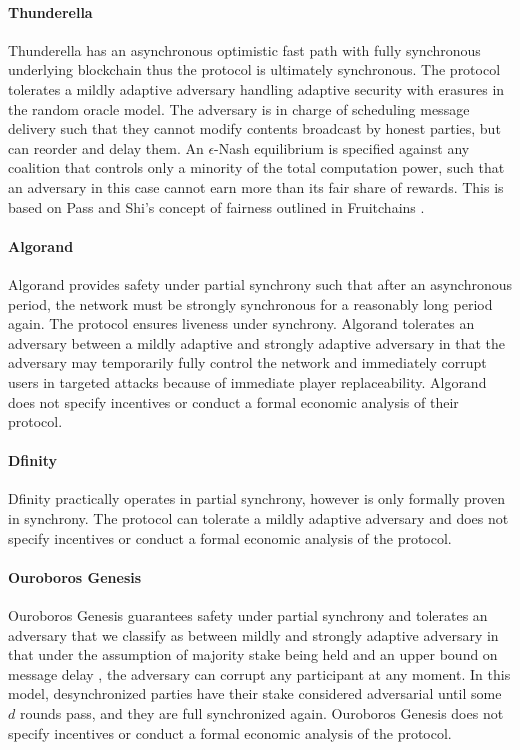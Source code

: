 \documentclass[10pt,journal,compsoc]{IEEEtran}
\newcommand\note[1]{\todo[inline]{\textbf{TODO:} #1}}
\begin{document}
\paragraph{Thunderella} Thunderella has an asynchronous optimistic fast path with fully synchronous underlying blockchain thus the protocol is ultimately synchronous. The protocol tolerates a mildly adaptive adversary handling adaptive security with erasures in the random oracle model. The adversary is in charge of scheduling message delivery such that they cannot modify contents broadcast by honest parties, but can reorder and delay them. An $\epsilon$-Nash equilibrium is specified against any coalition that controls only a minority of the total computation power, such that an adversary in this case cannot earn more than its fair share of rewards. This is based on Pass and Shi's concept of fairness outlined in Fruitchains \cite{fruitchains}.
\paragraph{Algorand} Algorand provides safety under partial synchrony such that after an asynchronous period, the network must be strongly synchronous for a reasonably long period again. The protocol ensures liveness under synchrony. Algorand tolerates an adversary between a mildly adaptive and strongly adaptive adversary in that the adversary may temporarily fully control the network and immediately corrupt users in targeted attacks because of immediate player replaceability. Algorand does not specify incentives or conduct a formal economic analysis of their protocol. 
\paragraph{Dfinity} Dfinity practically operates in partial synchrony, however is only formally proven in synchrony. The protocol can tolerate a mildly adaptive adversary and does not specify incentives or conduct a formal economic analysis of the protocol.
\paragraph{Ouroboros Genesis} Ouroboros Genesis guarantees safety under partial synchrony and tolerates an adversary that we classify as between mildly and strongly adaptive adversary in that under the assumption of majority stake being held and an upper bound on message delay \note{rephrase}, the adversary can corrupt any participant at any moment. In this model, desynchronized parties have their stake considered adversarial until some $d$ rounds pass, and they are full synchronized again. Ouroboros Genesis does not specify incentives or conduct a formal economic analysis of the protocol. 
\end{document}
